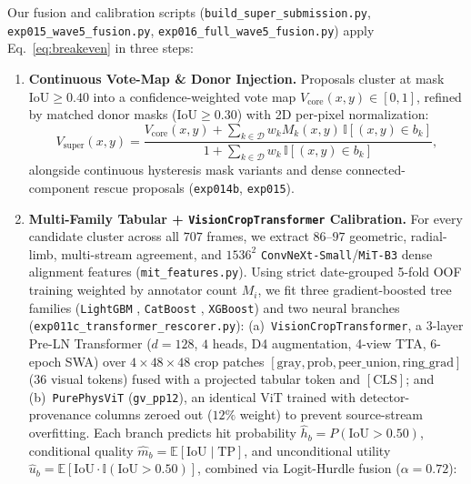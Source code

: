 \documentclass[sigconf]{acmart}
\begin{document}
Our fusion and calibration scripts (\texttt{build\_\allowbreak super\_\allowbreak submission.py}, \texttt{exp015\_\allowbreak wave5\_\allowbreak fusion.py}, \texttt{exp016\_\allowbreak full\_\allowbreak wave5\_\allowbreak fusion.py}) apply Eq.~\eqref{eq:breakeven} in three steps:
\begin{enumerate}
  \item \textbf{Continuous Vote-Map \& Donor Injection.} Proposals cluster at mask $\mathrm{IoU} \ge 0.40$ into a confidence-weighted vote map $V_{\mathrm{core}}(x,y) \in [0,1]$, refined by matched donor masks ($\mathrm{IoU}\ge 0.30$) with 2D per-pixel normalization:
  \begin{equation}\label{eq:vsuper}
    V_{\mathrm{super}}(x,y) = \frac{V_{\mathrm{core}}(x,y) + \sum_{k\in\mathcal{D}} w_k M_k(x,y)\,\mathbb{I}[(x,y)\in b_k]}{1 + \sum_{k\in\mathcal{D}} w_k\,\mathbb{I}[(x,y)\in b_k]},
  \end{equation}
  alongside continuous hysteresis mask variants and dense connected-component rescue proposals (\texttt{exp014b}, \texttt{exp015}).
  \item \textbf{Multi-Family Tabular + \texttt{Vision\allowbreak Crop\allowbreak Transformer} Calibration.} For every candidate cluster across all $707$ frames, we extract $86\text{--}97$ geometric, radial-limb, multi-stream agreement, and $1536^2$ \texttt{ConvNeXt-\allowbreak Small}/\texttt{MiT-B3} dense alignment features (\texttt{mit\_\allowbreak features.py}). Using strict date-grouped 5-fold OOF training weighted by annotator count $M_i$, we fit three gradient-boosted tree families (\texttt{LightGBM} \cite{ke2017lightgbm}, \texttt{CatBoost} \cite{prokhorenkova2018catboost}, \texttt{XGBoost}) and two neural branches (\texttt{exp011c\_\allowbreak transformer\_\allowbreak rescorer.py}): (a)~\texttt{Vision\allowbreak Crop\allowbreak Transformer}, a 3-layer Pre-LN Transformer ($d{=}128$, $4$ heads, D4 augmentation, 4-view TTA, 6-epoch SWA) over $4\times 48\times 48$ crop patches $[\text{gray}, \text{prob}, \text{peer\_union}, \text{ring\_grad}]$ ($36$ visual tokens) fused with a projected tabular token and $[\mathrm{CLS}]$; and (b)~\texttt{PurePhysViT} (\texttt{gv\_pp12}), an identical ViT trained with detector-provenance columns zeroed out ($12\%$ weight) to prevent source-stream overfitting. Each branch predicts hit probability $\hat{h}_b = P(\mathrm{IoU}>0.50)$, conditional quality $\hat{m}_b = \mathbb{E}[\mathrm{IoU}\mid\mathrm{TP}]$, and unconditional utility $\hat{u}_b = \mathbb{E}[\mathrm{IoU}\cdot\mathbb{I}(\mathrm{IoU}>0.50)]$, combined via Logit-Hurdle fusion ($\alpha=0.72$):

\end{enumerate}
\end{document}
